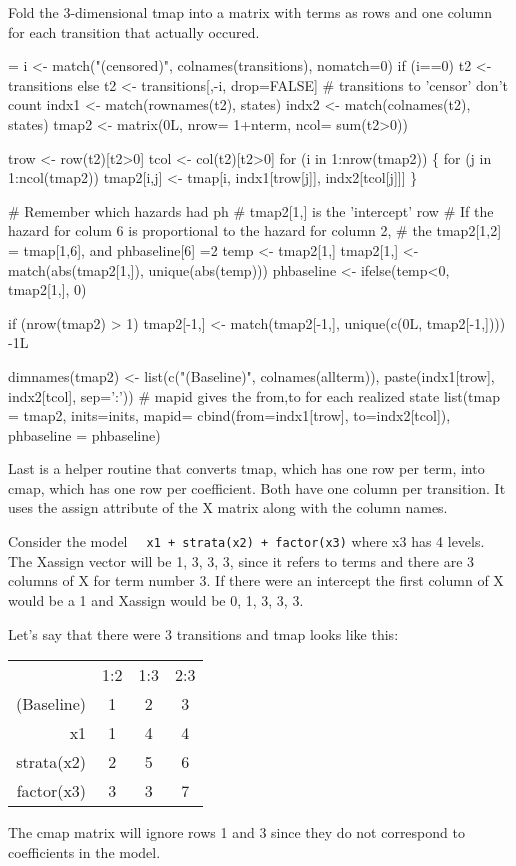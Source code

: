 \documentclass{article}
\newcommand{\code}[1]{\texttt{#1}}
\begin{document}
Fold the 3-dimensional tmap into a matrix with terms as rows
and one column for each transition that actually occured.
 
\begin{nwchunk}
=
 i <- match("(censored)", colnames(transitions), nomatch=0)
 if (i==0) t2 <- transitions
 else t2 <- transitions[,-i, drop=FALSE]   # transitions to 'censor' don't count
 indx1 <- match(rownames(t2), states)
 indx2 <- match(colnames(t2), states)
 tmap2 <- matrix(0L, nrow= 1+nterm, ncol= sum(t2>0))
 
 trow <- row(t2)[t2>0]
 tcol <- col(t2)[t2>0]
 for (i in 1:nrow(tmap2)) \{
     for (j in 1:ncol(tmap2))
         tmap2[i,j] <- tmap[i, indx1[trow[j]], indx2[tcol[j]]]
 \}
 
 # Remember which hazards had ph
 # tmap2[1,] is the 'intercept' row
 # If the hazard for colum 6 is proportional to the hazard for column 2,
 # the tmap2[1,2] = tmap[1,6], and phbaseline[6] =2
 temp <- tmap2[1,]
 tmap2[1,] <- match(abs(tmap2[1,]), unique(abs(temp)))
 phbaseline <- ifelse(temp<0, tmap2[1,], 0)
                   
 if (nrow(tmap2) > 1)
     tmap2[-1,] <- match(tmap2[-1,], unique(c(0L, tmap2[-1,]))) -1L
   
 dimnames(tmap2) <- list(c("(Baseline)", colnames(allterm)),
                             paste(indx1[trow], indx2[tcol], sep=':')) 
 # mapid gives the from,to for each realized state
 list(tmap = tmap2, inits=inits, mapid= cbind(from=indx1[trow], to=indx2[tcol]),
      phbaseline = phbaseline)
\end{nwchunk}


Last is a helper routine that converts tmap, which has one row per term,
into cmap, which has one row per coefficient.  Both have one column per 
transition.
It uses the assign attribute of the X matrix along with the column names.

Consider the model \code{~ x1 + strata(x2) + factor(x3)} where x3 has 4 levels.
The Xassign vector will be 1, 3, 3, 3, since it refers to terms and there are 3
columns of X for term number 3.
If there were an intercept the first column of X
would be a 1 and Xassign would be 0, 1, 3, 3, 3.

Let's say that there were 3 transitions and tmap looks like this:
\begin{tabular}{rccc}
            & 1:2 & 1:3 & 2:3 \\
(Baseline)  & 1   & 2   & 3 \\
 x1         & 1   & 4   & 4 \\ 
 strata(x2) & 2   & 5   & 6 \\
 factor(x3) & 3   & 3   & 7
\end{tabular}
The cmap matrix will ignore rows 1 and 3 since they do not correspond to 
coefficients in the model.   
\end{document}
